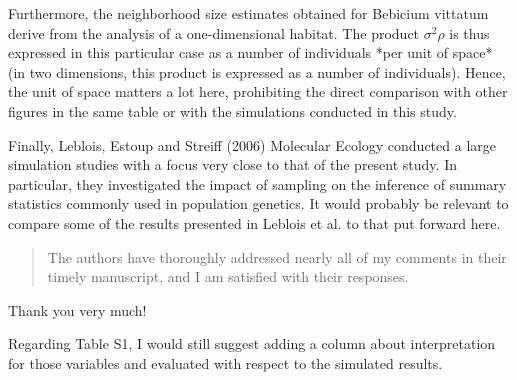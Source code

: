 \begin{point}{}
Furthermore, the neighborhood size estimates obtained for Bebicium vittatum derive from the analysis of a one-dimensional habitat. The product $\sigma^2 \rho$ is thus expressed in this particular case as a number of individuals *per unit of space* (in two dimensions, this product is expressed as a number of individuals). Hence, the unit of space matters a lot here, prohibiting the direct comparison with other figures in the same table or with the simulations conducted in this study.
\end{point}



\begin{point}{}
Finally, Leblois, Estoup and Streiff (2006) Molecular Ecology conducted a large simulation studies with a focus very close to that of the present study. In particular, they investigated the impact of sampling on the inference of summary statistics commonly used in population genetics. It would probably be relevant to compare some of the results presented in Leblois et al. to that put forward here.
\end{point}






\begin{quote}
The authors have thoroughly addressed nearly all of my comments in their timely manuscript, and I am satisfied with their responses.
\end{quote}

Thank you very much!

\begin{point}{}
Regarding Table S1, I would still suggest adding a column about interpretation for those variables and evaluated with respect to the simulated results.
\end{point}



